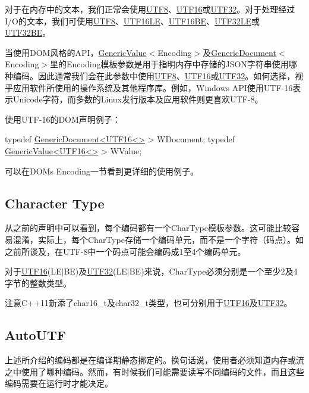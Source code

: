 对于在内存中的文本，我们正常会使用{\ttfamily \hyperlink{struct_u_t_f8}{U\+T\+F8}}、{\ttfamily \hyperlink{struct_u_t_f16}{U\+T\+F16}}或{\ttfamily \hyperlink{struct_u_t_f32}{U\+T\+F32}}。对于处理经过\+I/\+O的文本，我们可使用{\ttfamily \hyperlink{struct_u_t_f8}{U\+T\+F8}}、{\ttfamily \hyperlink{struct_u_t_f16_l_e}{U\+T\+F16\+LE}}、{\ttfamily \hyperlink{struct_u_t_f16_b_e}{U\+T\+F16\+BE}}、{\ttfamily \hyperlink{struct_u_t_f32_l_e}{U\+T\+F32\+LE}}或{\ttfamily \hyperlink{struct_u_t_f32_b_e}{U\+T\+F32\+BE}}。

当使用\+D\+O\+M风格的\+A\+P\+I，{\ttfamily \hyperlink{class_generic_value}{Generic\+Value}$<$Encoding$>$}及{\ttfamily \hyperlink{class_generic_document}{Generic\+Document}$<$Encoding$>$}里的{\ttfamily Encoding}模板参数是用于指明内存中存储的\+J\+S\+O\+N字符串使用哪种编码。因此通常我们会在此参数中使用{\ttfamily \hyperlink{struct_u_t_f8}{U\+T\+F8}}、{\ttfamily \hyperlink{struct_u_t_f16}{U\+T\+F16}}或{\ttfamily \hyperlink{struct_u_t_f32}{U\+T\+F32}}。如何选择，视乎应用软件所使用的操作系统及其他程序库。例如，\+Windows A\+P\+I使用\+U\+T\+F-\/16表示\+Unicode字符，而多数的\+Linux发行版本及应用软件则更喜欢\+U\+T\+F-\/8。

使用\+U\+T\+F-\/16的\+D\+O\+M声明例子：


\begin{DoxyCode}
\textcolor{keyword}{typedef} \hyperlink{class_generic_document}{GenericDocument<UTF16<>} > WDocument;
\textcolor{keyword}{typedef} \hyperlink{class_generic_value}{GenericValue<UTF16<>} > WValue;
\end{DoxyCode}


可以在D\+OM\textquotesingle{}s Encoding一节看到更详细的使用例子。\hypertarget{md_Commun_Externe_RapidJSON_doc_encoding.zh-cn_CharacterType}{}\subsection{Character Type}\label{md_Commun_Externe_RapidJSON_doc_encoding.zh-cn_CharacterType}
从之前的声明中可以看到，每个编码都有一个{\ttfamily Char\+Type}模板参数。这可能比较容易混淆，实际上，每个{\ttfamily Char\+Type}存储一个编码单元，而不是一个字符（码点）。如之前所谈及，在\+U\+T\+F-\/8中一个码点可能会编码成1至4个编码单元。

对于{\ttfamily \hyperlink{struct_u_t_f16}{U\+T\+F16}(L\+E$\vert$\+BE)}及{\ttfamily \hyperlink{struct_u_t_f32}{U\+T\+F32}(L\+E$\vert$\+BE)}来说，{\ttfamily Char\+Type}必须分别是一个至少2及4字节的整数类型。

注意\+C++11新添了{\ttfamily char16\+\_\+t}及{\ttfamily char32\+\_\+t}类型，也可分别用于{\ttfamily \hyperlink{struct_u_t_f16}{U\+T\+F16}}及{\ttfamily \hyperlink{struct_u_t_f32}{U\+T\+F32}}。\hypertarget{md_Commun_Externe_RapidJSON_doc_encoding.zh-cn_AutoUTF}{}\subsection{Auto\+U\+TF}\label{md_Commun_Externe_RapidJSON_doc_encoding.zh-cn_AutoUTF}
上述所介绍的编码都是在编译期静态挷定的。换句话说，使用者必须知道内存或流之中使用了哪种编码。然而，有时候我们可能需要读写不同编码的文件，而且这些编码需要在运行时才能决定。

